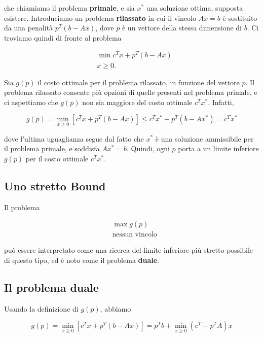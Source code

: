\documentclass[a4paper, 11pt]{article}
\begin{document}
        che chiamiamo il problema \textbf{primale}, e sia $x^*$ una soluzione ottima, supposta esistere. Introduciamo un problema \textbf{rilassato} in cui il vincolo $Ax = b$ è sostituito da una penalità $p^T (b - Ax)$, dove $p$ è un vettore della stessa dimensione di $b$. Ci troviamo quindi di fronte al problema

        
        \begin{align*}
            & \min c^T x + p^T (b - Ax) \\
            & x \geq 0.
        \end{align*}
        

        Sia $g(p)$ il costo ottimale per il problema rilassato, in funzione del vettore $p$. Il problema rilassato consente più opzioni di quelle presenti nel problema primale, e ci aspettiamo che $g(p)$ non sia maggiore del costo ottimale $c^T x^*$. Infatti,

        \[
            g(p) = \min_{x \geq 0} [c^T x + p^T (b - Ax)] \leq c^T x^* + p^T (b - Ax^*) = c^T x^*
        \]

        dove l'ultima uguaglianza segue dal fatto che $x^*$ è una soluzione ammissibile per il problema primale, e soddisfa $Ax^* = b$. Quindi, ogni $p$ porta a un limite inferiore $g(p)$ per il costo ottimale $c^T x^*$.



        \subsection{Uno stretto Bound}
        Il problema

        \[
        \begin{aligned}
            &\max g(p) \\
            & \text{nessun vincolo}
        \end{aligned}
        \]

        può essere interpretato come una ricerca del limite inferiore più stretto possibile di questo tipo, ed è noto come il problema \textbf{duale}.

        \subsection{Il problema duale}
        Usando la definizione di $g(p)$, abbiamo

        \[
        g(p) = \min_{x \geq 0} [c^T x + p^T (b - Ax)] = p^T b + \min_{x \geq 0} (c^T - p^T A)x
        \]
\end{document}
